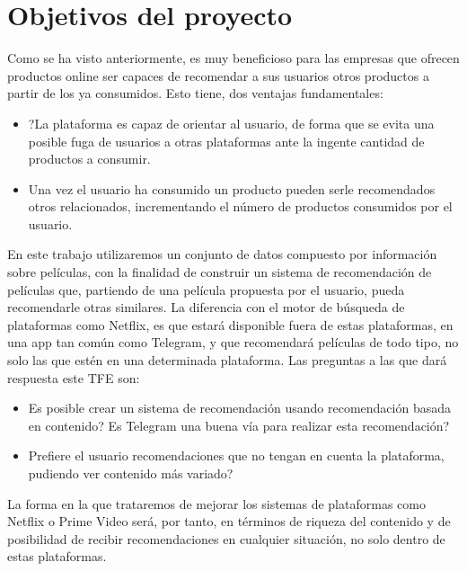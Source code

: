 \section{Objetivos del proyecto}\label{sec:objetivos}

Como se ha visto anteriormente, es muy beneficioso para las empresas que ofrecen productos online ser capaces de recomendar a sus usuarios otros productos a partir de los ya consumidos. Esto tiene, dos ventajas fundamentales:

\begin{itemize}
    \item ?La plataforma es capaz de orientar al usuario, de forma que se evita una posible fuga de usuarios a otras plataformas ante la ingente cantidad de productos a consumir.
    \item Una vez el usuario ha consumido un producto pueden serle recomendados otros relacionados, incrementando el número de productos consumidos por el usuario.
\end{itemize}

En este trabajo utilizaremos un conjunto de datos compuesto por información sobre películas, con la finalidad de construir un sistema de recomendación de películas que, partiendo de una película propuesta por el usuario, pueda recomendarle otras similares. La diferencia con el motor de búsqueda de plataformas como Netflix, es que estará disponible fuera de estas plataformas, en una app tan común como Telegram, y que recomendará películas de todo tipo, no solo las que estén en una determinada plataforma. Las preguntas a las que dará respuesta este TFE son:
\begin{itemize}
    \item \textquestiondown Es posible crear un sistema de recomendación usando recomendación basada en contenido? \textquestiondown Es Telegram una buena vía para realizar esta recomendación?
    \item \textquestiondown Prefiere el usuario recomendaciones que no tengan en cuenta la plataforma, pudiendo ver contenido más variado?
\end{itemize}

La forma en la que trataremos de mejorar los sistemas de plataformas como Netflix o Prime Video será, por tanto, en términos de riqueza del contenido y de posibilidad de recibir recomendaciones en cualquier situación, no solo dentro de estas plataformas.\\

